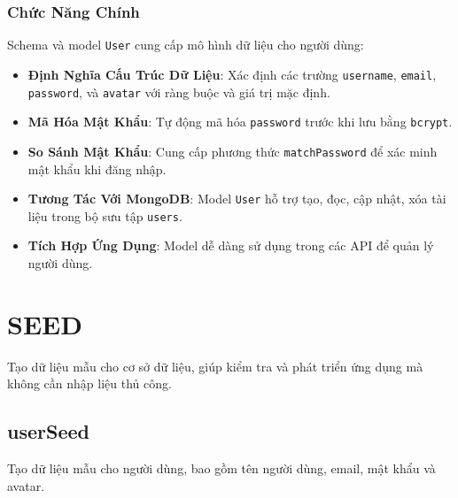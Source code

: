             \subsubsection{Chức Năng Chính}
                \hspace*{0.6cm}Schema và model \texttt{User} cung cấp mô hình dữ liệu cho người dùng:
                \begin{itemize}
                    \item \textbf{Định Nghĩa Cấu Trúc Dữ Liệu}: Xác định các trường \texttt{username}, \texttt{email}, \texttt{password}, và \texttt{avatar} với ràng buộc và giá trị mặc định.
                    \item \textbf{Mã Hóa Mật Khẩu}: Tự động mã hóa \texttt{password} trước khi lưu bằng \texttt{bcrypt}.
                    \item \textbf{So Sánh Mật Khẩu}: Cung cấp phương thức \texttt{matchPassword} để xác minh mật khẩu khi đăng nhập.
                    \item \textbf{Tương Tác Với MongoDB}: Model \texttt{User} hỗ trợ tạo, đọc, cập nhật, xóa tài liệu trong bộ sưu tập \texttt{users}.
                    \item \textbf{Tích Hợp Ứng Dụng}: Model dễ dàng sử dụng trong các API để quản lý người dùng.
                \end{itemize}
    \section{SEED}
        \hspace*{0.6cm}Tạo dữ liệu mẫu cho cơ sở dữ liệu, giúp kiểm tra và phát triển ứng dụng mà không cần nhập liệu thủ công.
        \subsection{userSeed}
            \hspace*{0.6cm}Tạo dữ liệu mẫu cho người dùng, bao gồm tên người dùng, email, mật khẩu và avatar.
